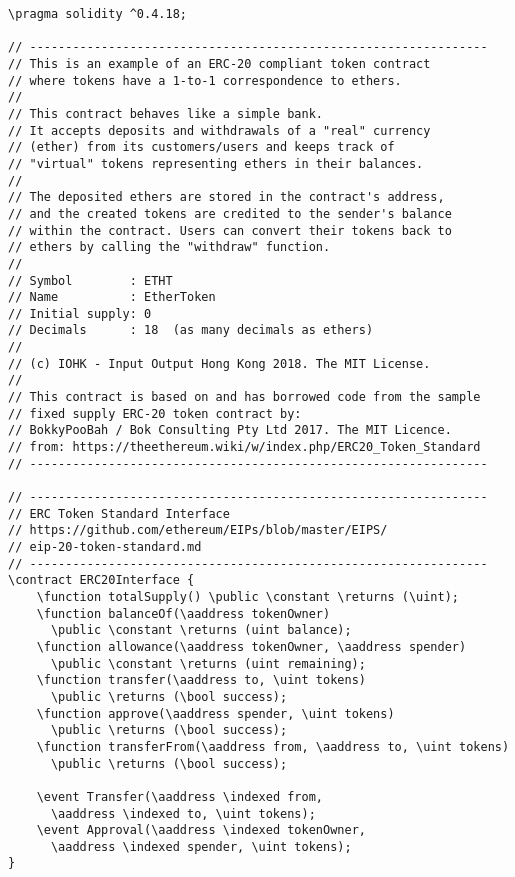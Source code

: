 \documentclass{llncs}
\newcommand{\red}[1]{\textcolor[rgb]{1,0,0}{#1}}
\newcommand{\blue}[1]{\textcolor[rgb]{0,0,1}{#1}}
\newcommand{\brown}[1]{\textcolor[rgb]{0.8,0.6,0.4}{#1}}
\newcommand{\verbsize}{\small}
\newcommand{\pragma}{\red{pragma}}
\newcommand{\contract}{\red{contract}}
\newcommand{\function}{\blue{function}}
\newcommand{\event}{\blue{event}}
\newcommand{\returns}{\blue{returns}}
\newcommand{\public}{\blue{public}}
\newcommand{\constant}{\blue{constant}}
\newcommand{\indexed}{\blue{indexed}}
\newcommand{\uint}{\brown{uint}}
\newcommand{\bool}{\brown{bool}}
\newcommand{\aaddress}{\brown{address}}
\begin{document}
\begin{small}
\begin{Verbatim}[commandchars=\\\?\?,fontsize=\verbsize]
\pragma solidity ^0.4.18;
 
// ----------------------------------------------------------------
// This is an example of an ERC-20 compliant token contract 
// where tokens have a 1-to-1 correspondence to ethers.
//
// This contract behaves like a simple bank. 
// It accepts deposits and withdrawals of a "real" currency 
// (ether) from its customers/users and keeps track of 
// "virtual" tokens representing ethers in their balances.
//
// The deposited ethers are stored in the contract's address, 
// and the created tokens are credited to the sender's balance 
// within the contract. Users can convert their tokens back to 
// ethers by calling the "withdraw" function.
//
// Symbol        : ETHT
// Name          : EtherToken
// Initial supply: 0
// Decimals      : 18  (as many decimals as ethers)
//
// (c) IOHK - Input Output Hong Kong 2018. The MIT License.
//
// This contract is based on and has borrowed code from the sample 
// fixed supply ERC-20 token contract by:
// BokkyPooBah / Bok Consulting Pty Ltd 2017. The MIT Licence.
// from: https://theethereum.wiki/w/index.php/ERC20_Token_Standard
// ----------------------------------------------------------------

// ----------------------------------------------------------------
// ERC Token Standard Interface
// https://github.com/ethereum/EIPs/blob/master/EIPS/
// eip-20-token-standard.md
// ----------------------------------------------------------------
\contract ERC20Interface {
    \function totalSupply() \public \constant \returns (\uint);
    \function balanceOf(\aaddress tokenOwner) 
      \public \constant \returns (uint balance);
    \function allowance(\aaddress tokenOwner, \aaddress spender) 
      \public \constant \returns (uint remaining);
    \function transfer(\aaddress to, \uint tokens) 
      \public \returns (\bool success);
    \function approve(\aaddress spender, \uint tokens) 
      \public \returns (\bool success);
    \function transferFrom(\aaddress from, \aaddress to, \uint tokens)
      \public \returns (\bool success);

    \event Transfer(\aaddress \indexed from, 
      \aaddress \indexed to, \uint tokens);
    \event Approval(\aaddress \indexed tokenOwner, 
      \aaddress \indexed spender, \uint tokens);
}


\end{Verbatim}
\end{small}
\end{document}
